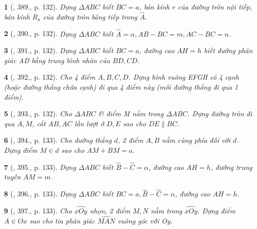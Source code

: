 \documentclass{article}
\newtheorem{baitoan}{}
\begin{document}
\begin{baitoan}[\cite{Binh_Toan_9_tap_2}, 389., p. 132]
	Dựng $\Delta ABC$ biết $BC = a$, bán kính $r$ của đường tròn nội tiếp, bán kính $R_a$ của đường tròn bàng tiếp trong $\widehat{A}$.
\end{baitoan}

\begin{baitoan}[\cite{Binh_Toan_9_tap_2}, 390., p. 132]
	Dựng $\Delta ABC$ biết $\widehat{A} = \alpha,AB - BC = m,AC - BC = n$.
\end{baitoan}

\begin{baitoan}[\cite{Binh_Toan_9_tap_2}, 391., p. 132]
	Dựng $\Delta ABC$ biết $BC = a$, đường cao $AH = h$ biết đường phân giác AD bằng trung bình nhân của $BD,CD$.
\end{baitoan}

\begin{baitoan}[\cite{Binh_Toan_9_tap_2}, 392., p. 132]
	Cho 4 điểm $A,B,C,D$. Dựng hình vuông EFGH có 4 cạnh (hoặc đường thẳng chứa cạnh) đi qua 4 điểm này (mỗi đường thẳng đi qua 1 điểm).
\end{baitoan}

\begin{baitoan}[\cite{Binh_Toan_9_tap_2}, 393., p. 132]
	Cho $\Delta ABC$ \& điểm M nằm trong $\Delta ABC$. Dựng đường tròn đi qua $A,M$, cắt $AB,AC$ lần lượt ở $D,E$ sao cho $DE\parallel BC$.
\end{baitoan}

\begin{baitoan}[\cite{Binh_Toan_9_tap_2}, 394., p. 133]
	Cho đường thẳng $d$, 2 điểm $A,B$ nằm cùng phía đối với $d$. Dựng điểm $M\in d$ sao cho $AM + BM = a$.
\end{baitoan}

\begin{baitoan}[\cite{Binh_Toan_9_tap_2}, 395., p. 133]
	Dựng $\Delta ABC$ biết $\widehat{B} - \widehat{C} = \alpha$, đường cao $AH = h$, đường trung tuyến $AM = m$.
\end{baitoan}

\begin{baitoan}[\cite{Binh_Toan_9_tap_2}, 396., p. 133]
	Dựng $\Delta ABC$ biết $BC = a,\widehat{B} - \widehat{C} = \alpha$, đường cao $AH = h$.
\end{baitoan}

\begin{baitoan}[\cite{Binh_Toan_9_tap_2}, 397., p. 133]
	Cho $\widehat{xOy}$ nhọn, 2 điểm $M,N$ nằm trong $\widehat{xOy}$. Dựng điểm $A\in Ox$ sao cho tia phân giác $\widehat{MAN}$ vuông góc với Oy.
\end{baitoan}
\end{document}
